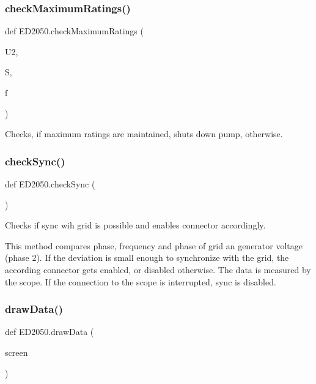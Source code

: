 \subsubsection{\texorpdfstring{check\+Maximum\+Ratings()}{checkMaximumRatings()}}
{\footnotesize\ttfamily def E\+D2050.\+check\+Maximum\+Ratings (\begin{DoxyParamCaption}\item[{}]{U2,  }\item[{}]{S,  }\item[{}]{f }\end{DoxyParamCaption})}

\begin{DoxyVerb}Checks, if maximum ratings are maintained, shuts down pump, otherwise. 
\end{DoxyVerb}
 \mbox{\label{namespaceED2050_a9e2f75b5080651a861371e2c60643309}} 
\subsubsection{\texorpdfstring{check\+Sync()}{checkSync()}}
{\footnotesize\ttfamily def E\+D2050.\+check\+Sync (\begin{DoxyParamCaption}{ }\end{DoxyParamCaption})}

\begin{DoxyVerb}Checks if sync wih grid is possible and enables connector accordingly.

This method compares phase, frequency and phase of grid an generator
voltage (phase 2). If the deviation is small enough to synchronize with
the grid, the according connector gets enabled, or disabled otherwise.
The data is measured by the scope. If the connection to the scope is
interrupted, sync is disabled. 
\end{DoxyVerb}
 \mbox{\label{namespaceED2050_ae549372de5246cb01c9d854b836da86d}} 
\subsubsection{\texorpdfstring{draw\+Data()}{drawData()}}
{\footnotesize\ttfamily def E\+D2050.\+draw\+Data (\begin{DoxyParamCaption}\item[{}]{screen }\end{DoxyParamCaption})}

